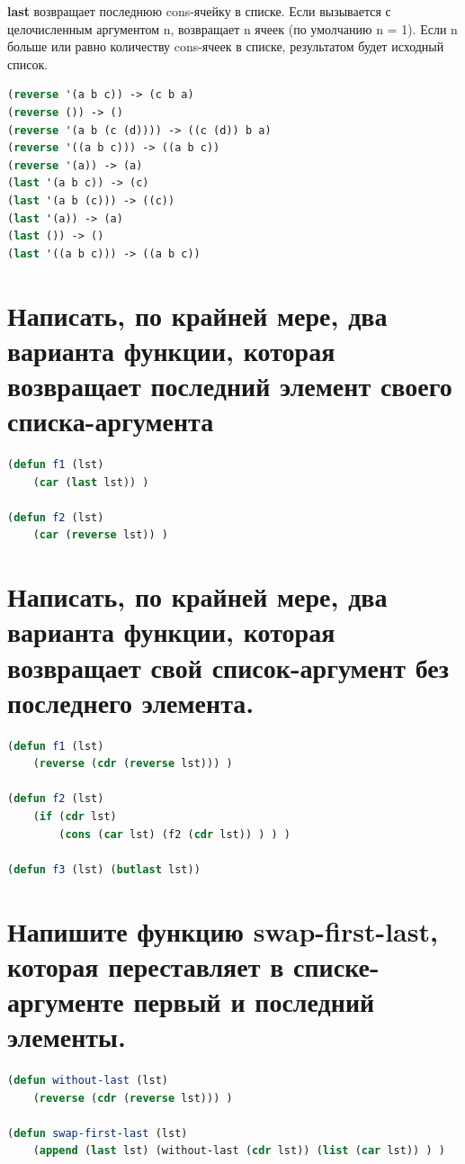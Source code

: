 \documentclass[12pt]{report}
\begin{document}
\textbf{last} возвращает последнюю cons-ячейку в списке. Если вызывается с целочисленным аргументом n, возвращает n ячеек (по умолчанию n = 1).
Если n больше или равно количеству cons-ячеек в списке, результатом будет исходный список.

\begin{lstlisting}[language=Lisp]
(reverse '(a b c)) -> (c b a)               
(reverse ()) -> ()
(reverse '(a b (c (d)))) -> ((c (d)) b a)   
(reverse '((a b c))) -> ((a b c))
(reverse '(a)) -> (a)
(last '(a b c)) -> (c)                      
(last '(a b (c))) -> ((c))
(last '(a)) -> (a)                          
(last ()) -> ()
(last '((a b c))) -> ((a b c))

\end{lstlisting}
 

\section{Написать, по крайней мере, два варианта функции, которая возвращает
последний элемент своего списка-аргумента}

\begin{lstlisting}[language=Lisp]
(defun f1 (lst) 
    (car (last lst)) )

(defun f2 (lst) 
    (car (reverse lst)) )
\end{lstlisting}


\section{Написать, по крайней мере, два варианта функции, которая возвращает
свой список-аргумент без последнего элемента. } 

\begin{lstlisting}[language=Lisp]
(defun f1 (lst) 
    (reverse (cdr (reverse lst))) )

(defun f2 (lst) 
    (if (cdr lst)
        (cons (car lst) (f2 (cdr lst)) ) ) )

(defun f3 (lst) (butlast lst))
\end{lstlisting}


\section{Напишите функцию swap-first-last, которая переставляет в списке-аргументе первый и последний элементы.}

\begin{lstlisting}[language=Lisp]
(defun without-last (lst) 
    (reverse (cdr (reverse lst))) )
    
(defun swap-first-last (lst) 
    (append (last lst) (without-last (cdr lst)) (list (car lst)) ) )
\end{lstlisting}
\end{document}
